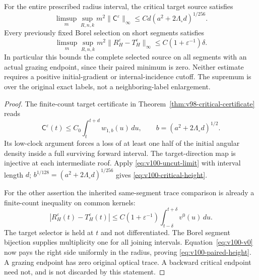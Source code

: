 \begin{theorem}
\label{thm:v100-recovery}
For the entire prescribed radius interval, the critical target source
satisfies
\begin{equation}\label{eq:v100-critical-height}
 \limsup_m\sup_{R,n,k}m^2\|\mathsf C^\varepsilon\|_\infty
          \le C d(a^2+2\Lambda_\circ d)^{1/256}.
\end{equation}
Every previously fixed Borel selection on short segments satisfies
\begin{equation}\label{eq:v100-paired-height}
 \limsup_m\sup_{R,n,k}m^2
       \|R_H^\varepsilon-T_H^\varepsilon\|_\infty
                         \le C(1+\varepsilon^{-1})\delta.
\end{equation}
In particular this bounds the complete selected source on all
segments with an actual grazing endpoint, since their paired minimum
is zero. Neither estimate requires a positive initial-gradient or
internal-incidence cutoff. The supremum is over the original exact
labels, not a neighboring-label enlargement.
\end{theorem}
\begin{proof}
The finite-count target certificate in
Theorem~\ref{thm:v98-critical-certificate} reads
\[
 \mathsf C^\varepsilon(t)\le
 C_0\int_t^{t+d}w_{1,b}(u)\,du,
 \qquad b=(a^2+2\Lambda_\circ d)^{1/2}.
\]
Its low-clock argument forces a loss of at least one half of the
initial angular density inside a full surviving forward interval.
The target-direction map is injective at each intermediate roof.
Apply \eqref{eq:v100-uncut-limit} with interval length $d$;
$b^{1/128}=(a^2+2\Lambda_\circ d)^{1/256}$ gives
\eqref{eq:v100-critical-height}.

For the other assertion the inherited same-segment trace comparison
is already a finite-count inequality on common kernels:
\[
 |R_H^\varepsilon(t)-T_H^\varepsilon(t)|
 \le C(1+\varepsilon^{-1})
              \int_{t-\delta}^{t+\delta}v^0(u)\,du.
\]
The target selector is held at $t$ and not differentiated. The Borel
segment bijection supplies multiplicity one for all joining intervals.
Equation~\eqref{eq:v100-v0} now pays the right side uniformly in the
radius, proving \eqref{eq:v100-paired-height}. A grazing endpoint has
zero original optical trace. A backward critical endpoint need not,
and is not discarded by this statement.
\end{proof}

